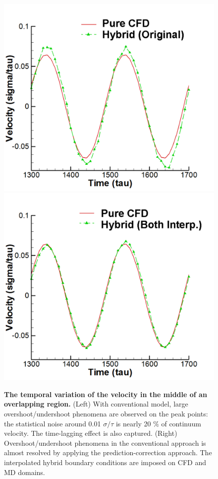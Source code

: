 \documentclass[preprint,12pt]{elsarticle}
\begin{document}
\begin{figure}
\centering
\includegraphics[width=0.6\linewidth]{Stokes_Org_Multi.pdf}
\hskip 1cm
\includegraphics[width=0.6\linewidth]{Stokes_Both_Multi.pdf}
\vskip-0.2cm
\caption{\small {\bf The temporal variation of the velocity in the middle of an overlapping region.} (Left) With conventional model, large overshoot/undershoot phenomena are observed on the peak points: the statistical noise around 0.01 $\sigma/\tau$ is nearly 20 $\%$ of continuum velocity. The time-lagging effect is also captured. (Right) Overshoot/undershoot phenomena in the conventional approach is almost resolved by applying the prediction-correction approach. The interpolated hybrid boundary conditions are imposed on CFD and MD domains.}
\label{Temporal1}
\end{figure}
\end{document}
